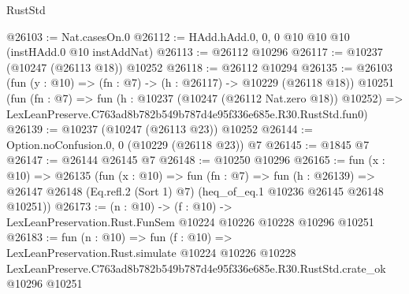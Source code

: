 \begin{lexlean}{RustStd}
\begin{coremodule}
@26103 := Nat.casesOn.{0}
@26112 := HAdd.hAdd.{0, 0, 0} @10 @10 @10 (instHAdd.{0} @10 instAddNat)
@26113 := @26112 @10296
@26117 := @10237 (@10247 (@26113 @18)) @10252
@26118 := @26112 @10294
@26135 := @26103
    (fun (y : @10) => (fn : @7) -> (h : @26117) -> @10229 (@26118 @18))
    @10251
    (fun (fn : @7) =>
    fun (h : @10237 (@10247 (@26112 Nat.zero @18)) @10252) =>
    LexLeanPreserve.C763ad8b782b549b787d4e95f336e685e.R30.RustStd.fun0)
@26139 := @10237 (@10247 (@26113 @23)) @10252
@26144 := Option.noConfusion.{0, 0} (@10229 (@26118 @23)) @7
@26145 := @1845 @7
@26147 := @26144 @26145 @7
@26148 := @10250 @10296
@26165 := fun (x : @10) =>
  @26135
    (fun (x : @10) =>
    fun (fn : @7) =>
    fun (h : @26139) =>
    @26147 @26148 (Eq.refl.{2} (Sort 1) @7) (heq_of_eq.{1} @10236 @26145 @26148 @10251))
@26173 := (n : @10) ->
  (f : @10) -> LexLeanPreservation.Rust.FunSem @10224 @10226 @10228 @10296 @10251
@26183 := fun (n : @10) =>
  fun (f : @10) =>
  LexLeanPreservation.Rust.simulate
    @10224
    @10226
    @10228
    LexLeanPreserve.C763ad8b782b549b787d4e95f336e685e.R30.RustStd.crate_ok
    @10296
    @10251
\end{coremodule}
\end{lexlean}
